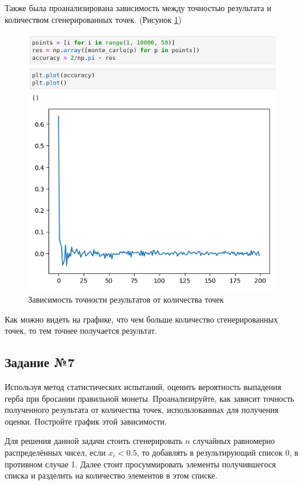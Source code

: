 \documentclass[14pt,fleqn]{extarticle}
\begin{document}
	Также была проанализирована зависимость между точностью результата и количеством сгенерированных точек. (Рисунок \ref{fig:monte_carlo_result})
	\begin{figure}[h]
		\centering \includegraphics[scale=0.5]{monte_carlo_result}
		\caption{Зависимость точности результатов от количества точек}
		\label{fig:monte_carlo_result}
	\end{figure}

	Как можно видеть на графике, что чем больше количество сгенерированных точек, то тем точнее получается результат.
	
	\newpage
	
	\subsection*{Задание №7}
	Используя метод статистических испытаний, оценить вероятность выпадения герба при бросании правильной монеты. Проанализируйте, как зависит точность полученного результата от количества точек, использованных для получения оценки. Постройте график этой зависимости.
	\newline
	
	Для решения данной задачи стоить сгенерировать $n$ случайных равномерно распределённых чисел, если $x_i < 0.5$, то добавлять в результирующий список 0, в противном случае 1. Далее стоит просуммировать элементы получившегося списка и разделить на количество элементов в этом списке.\\
	
\end{document}
